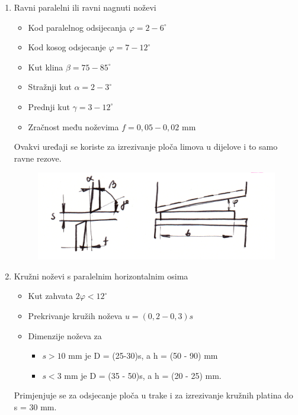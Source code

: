 \documentclass[a4paper,12pt]{article}
\numberwithin{figure}{section}
\begin{document}
\begin{enumerate}
\item Ravni paralelni ili ravni nagnuti noževi
\begin{itemize}
\item Kod paralelnog odsijecanja $\varphi = 2-6^{\circ}$
\item Kod kosog odsjecanje $\varphi = 7-12^{\circ}$
\item Kut klina $\beta = 75-85^{\circ}$
\item Stražnji kut $\alpha = 2-3^{\circ}$
\item Prednji kut $\gamma = 3-12^{\circ}$
\item Zračnost među noževima $f=0,05-0,02$ mm 
\end{itemize}
Ovakvi uređaji se koriste za izrezivanje ploča limova u dijelove i to samo ravne rezove.
\begin{figure}[!h]
\centering
\includegraphics[scale=0.2]{image_54-1.png}
\end{figure}
\FloatBarrier
\item Kružni noževi s paralelnim horizontalnim osima
\begin{itemize}
\item Kut zahvata $2\varphi<12^{\circ}$
\item Prekrivanje kružih noževa  $u = (0,2-0,3)s$
\item Dimenzije noževa za
\begin{itemize}
\item $s>10$ mm je D = (25-30)s, a h = (50 - 90) mm
\item $s<3$ mm je D = (35 - 50)s, a h = (20 - 25) mm.
\end{itemize}
\end{itemize}
Primjenjuje se za odsjecanje ploča u trake i za izrezivanje kružnih platina do s = 30 mm.
\begin{figure}[!h]
\centering

\end{figure}
\end{enumerate}
\end{document}
